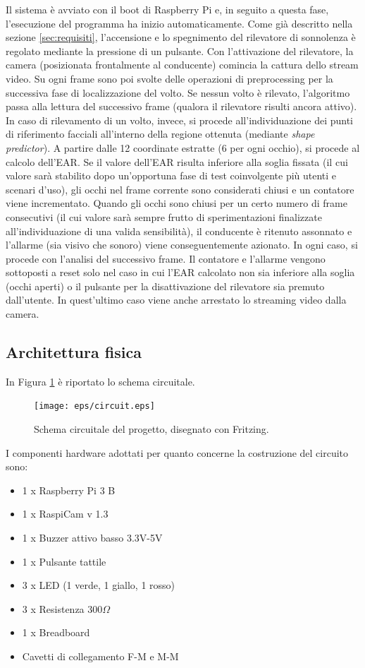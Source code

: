 \documentclass[12pt]{article}
\begin{document}
Il sistema è avviato con il boot di Raspberry Pi e, in seguito a questa fase, l'esecuzione del programma ha inizio automaticamente. Come già descritto nella sezione \ref{sec:requisiti}, l'accensione e lo spegnimento del rilevatore di sonnolenza è regolato mediante la pressione di un pulsante. Con l'attivazione del rilevatore, la camera (posizionata frontalmente al conducente) comincia la cattura dello stream video. Su ogni frame sono poi svolte delle operazioni di preprocessing per la successiva fase di localizzazione del volto. Se nessun volto è rilevato, l'algoritmo passa alla lettura del successivo frame (qualora il rilevatore risulti ancora attivo). In caso di rilevamento di un volto, invece, si procede all'individuazione dei punti di riferimento facciali all'interno della regione ottenuta (mediante \textit{shape predictor}). A partire dalle 12 coordinate estratte (6 per ogni occhio), si procede al calcolo dell'EAR. Se il valore dell'EAR risulta inferiore alla soglia fissata (il cui valore sarà stabilito dopo un'opportuna fase di test coinvolgente più utenti e scenari d'uso), gli occhi nel frame corrente sono considerati chiusi e un contatore viene incrementato. Quando gli occhi sono chiusi per un certo numero di frame consecutivi (il cui valore sarà sempre frutto di sperimentazioni finalizzate all'individuazione di una valida sensibilità), il conducente è ritenuto assonnato e l'allarme (sia visivo che sonoro) viene conseguentemente azionato. In ogni caso, si procede con l'analisi del successivo frame. Il contatore e l'allarme vengono sottoposti a reset solo nel caso in cui l'EAR calcolato non sia inferiore alla soglia (occhi aperti) o il pulsante per la disattivazione del rilevatore sia premuto dall'utente. In quest'ultimo caso viene anche arrestato lo streaming video dalla camera.

\subsection{Architettura fisica}
In Figura \ref{fig:circuit} è riportato lo schema circuitale.
\begin{figure}[!htb]
	\centering
	\texttt{[image: eps/circuit.eps]}
	\caption{Schema circuitale del progetto, disegnato con Fritzing\cite{Fritzing}.}
	\label{fig:circuit}
\end{figure}

I componenti hardware adottati per quanto concerne la costruzione del circuito sono:
\begin{itemize}
	\item 1 x Raspberry Pi 3 B
	\item 1 x RaspiCam v 1.3
	\item 1 x Buzzer attivo basso 3.3V-5V
	\item 1 x Pulsante tattile
	\item 3 x LED (1 verde, 1 giallo, 1 rosso)
	\item 3 x Resistenza 300$\Omega$
	\item 1 x Breadboard
	\item Cavetti di collegamento F-M e M-M
\end{itemize}
\end{document}
